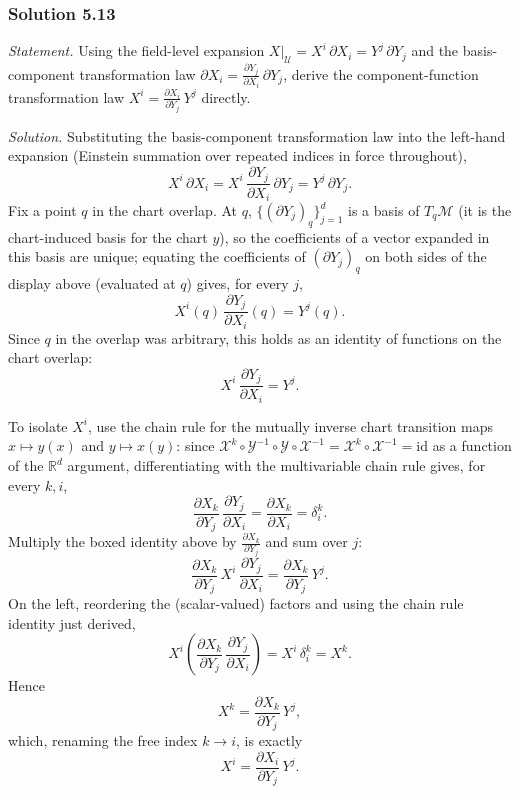 \documentclass[11pt]{article}
\begin{document}
\subsubsection*{Solution 5.13}

\noindent\textit{Statement.} Using the field-level expansion
$X|_{\mathcal U}=X^i\,\partial X_i=Y^j\,\partial Y_j$ and the
basis-component transformation law $\partial X_i=\frac{\partial
Y_j}{\partial X_i}\,\partial Y_j$, derive the component-function
transformation law $X^i=\frac{\partial X_i}{\partial Y_j}\,Y^j$ directly.

\medskip
\noindent\textit{Solution.} Substituting the basis-component
transformation law into the left-hand expansion (Einstein summation over
repeated indices in force throughout),
\[
X^i\,\partial X_i = X^i\,\frac{\partial Y_j}{\partial X_i}\,\partial Y_j = Y^j\,\partial Y_j.
\]
Fix a point $q$ in the chart overlap. At $q$, $\{(\partial
Y_j)_q\}_{j=1}^d$ is a basis of $T_q\mathcal M$ (it is the chart-induced
basis for the chart $y$), so the coefficients of a vector expanded in this
basis are unique; equating the coefficients of $(\partial Y_j)_q$ on both
sides of the display above (evaluated at $q$) gives, for every $j$,
\[
X^i(q)\,\frac{\partial Y_j}{\partial X_i}(q) = Y^j(q).
\]
Since $q$ in the overlap was arbitrary, this holds as an identity of
functions on the chart overlap:
\[
X^i\,\frac{\partial Y_j}{\partial X_i} = Y^j.
\]

To isolate $X^i$, use the chain rule for the mutually inverse chart
transition maps $x\mapsto y(x)$ and $y\mapsto x(y)$: since $\mathcal
X^k\circ\mathcal Y^{-1}\circ\mathcal Y\circ\mathcal X^{-1}=\mathcal
X^k\circ\mathcal X^{-1}=\mathrm{id}$ as a function of the $\mathbb R^d$
argument, differentiating with the multivariable chain rule gives, for
every $k,i$,
\[
\frac{\partial X_k}{\partial Y_j}\,\frac{\partial Y_j}{\partial X_i} = \frac{\partial X_k}{\partial X_i} = \delta^k_i.
\]
Multiply the boxed identity above by $\frac{\partial X_k}{\partial Y_j}$
and sum over $j$:
\[
\frac{\partial X_k}{\partial Y_j}\,X^i\,\frac{\partial Y_j}{\partial X_i} = \frac{\partial X_k}{\partial Y_j}\,Y^j.
\]
On the left, reordering the (scalar-valued) factors and using the chain
rule identity just derived,
\[
X^i\left(\frac{\partial X_k}{\partial Y_j}\,\frac{\partial Y_j}{\partial X_i}\right) = X^i\,\delta^k_i = X^k.
\]
Hence
\[
X^k = \frac{\partial X_k}{\partial Y_j}\,Y^j,
\]
which, renaming the free index $k\to i$, is exactly
\[
X^i = \frac{\partial X_i}{\partial Y_j}\,Y^j.
\]
\end{document}
